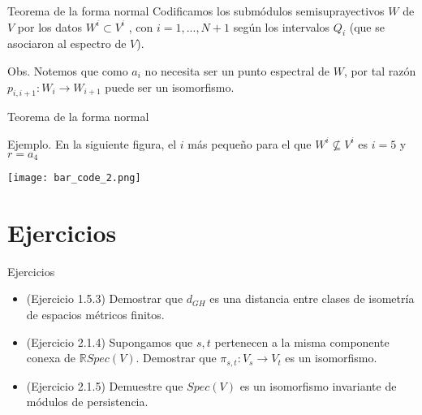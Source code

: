 \documentclass{beamer}
\newcounter{Ejercicio}
\begin{document}
\begin{frame}{Teorema de la forma normal}
    Codificamos los submódulos semisuprayectivos $W$ de $V$ por los datos $W^i \subset V^i$ , con $i = 1,...,N + 1$ según los intervalos $Q_i$ (que se asociaron al espectro de $V$). 
    \pause

    \begin{block}{Obs.}
    Notemos que como $a_i$ no necesita ser un punto espectral de $W$, por tal razón $p_{i,i+1} : W_i \to W_{i+1}$ puede ser un isomorfismo.
    \end{block}

\end{frame}


\begin{frame}{Teorema de la forma normal}
    \begin{block}{Ejemplo.}
    En la siguiente figura, el $i$ más pequeño para el que $W^{i} \nsubseteq V^{i}$ es $i = 5$ y $r=a_{4}$
    \end{block}
    \pause

    \texttt{[image: bar\_code\_2.png]}

\end{frame}

\section{Ejercicios}
\begin{frame}{Ejercicios}
    \begin{itemize}
        \item (Ejercicio 1.5.3) Demostrar que $d_{GH}$ es una distancia entre clases de isometría de espacios métricos finitos.
        
        \item (Ejercicio 2.1.4) Supongamos que $s,t$ pertenecen a la misma componente conexa de $\mathbb{R} Spec(V)$. Demostrar que $\pi_{s,t} : V_{s} \to V_{t}$ es un isomorfismo.
        \pause 

        \item (Ejercicio 2.1.5) Demuestre que $Spec(V)$ es un isomorfismo invariante de módulos de persistencia.
        \pause 

        
    \end{itemize}

\end{frame}
\end{document}
